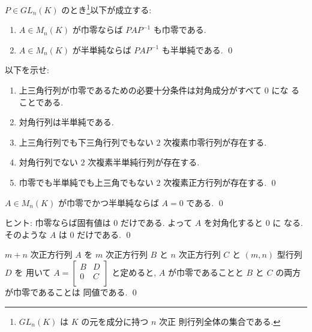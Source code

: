 \documentclass[12pt,twoside]{jarticle}
\begin{document}

\begin{question}
  $P\in GL_n(K)$ のとき\footnote{$GL_n(K)$ は $K$ の元を成分に持つ $n$ 次正
  則行列全体の集合である.}以下が成立する:
  \begin{enumerate}
  \item $A\in M_n(K)$ が巾零ならば $PAP^{-1}$ も巾零である.
  \item $A\in M_n(K)$ が半単純ならば $PAP^{-1}$ も半単純である.
    \qed
  \end{enumerate}
\end{question}


\begin{question}
  以下を示せ:
  \begin{enumerate}
  \item 上三角行列が巾零であるための必要十分条件は対角成分がすべて $0$ にな
    ることである.
  \item 対角行列は半単純である.
  \item 上三角行列でも下三角行列でもない $2$ 次複素巾零行列が存在する.
  \item 対角行列でない $2$ 次複素半単純行列が存在する.
  \item 巾零でも半単純でも上三角でもない $2$ 次複素正方行列が存在する.
    \qed
  \end{enumerate}
\end{question}


\begin{question}
\label{q:ss-cap-nil=0}
  $A\in M_n(K)$ が巾零でかつ半単純ならば $A=0$ である.
  \qed
\end{question}

\noindent
ヒント: 巾零ならば固有値は $0$ だけである.  よって $A$ を対角化すると $0$ に
なる.  そのような $A$ は $0$ だけである.
\qed


\begin{question}
\label{q:nilpotent:[B,C;0,D]}
  $m+n$ 次正方行列 $A$ 
  を $m$ 次正方行列 $B$ と $n$ 次正方行列 $C$ と $(m,n)$ 型行列 $D$ を
  用いて $
    A =
    \begin{bmatrix}
      B & D \\
      0 & C \\
    \end{bmatrix}
  $ と定めると, $A$ が巾零であることと $B$ と $C$ の両方が巾零であることは
  同値である.  
  \qed
\end{question}
\end{document}
